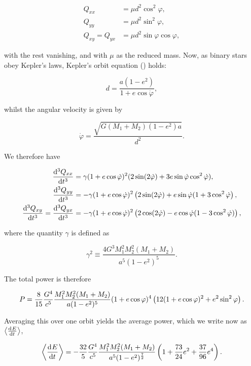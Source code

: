 \begin{align}
    Q_{xx} &= \mu d^2\cos^2\varphi, \\
    Q_{yy} &= \mu d^2\sin^2\varphi, \\
    Q_{xy} = Q_{yx} &= \mu d^2\sin\varphi\cos\varphi,
\end{align}

with the rest vanishing, and with $\mu$ as the reduced mass. Now, as binary stars obey Kepler's laws, Kepler's orbit equation () holds:

\begin{equation}
    d = \frac{a(1-e^2)}{1+e\cos\dot{\varphi}},
\end{equation}

whilst the angular velocity is given by

\begin{equation}
    \dot{\varphi} = \frac{\sqrt{G(M_1+M_2)(1-e^2)a}}{d^2}.
\end{equation}

We therefore have

\begin{align}
    \dv[3]{Q_{xx}}{t} &= \gamma (1+e\cos\dot{\varphi})^2(2\sin(2\dot{\varphi})+3e\sin\dot{\varphi}\cos^2\dot{\varphi}), \\
    \dv[3]{Q_{yy}}{t} &= -\gamma(1+e\cos\dot{\varphi})^2\pqty{2\sin(2\dot{\varphi})+e\sin\dot{\varphi}(1+3\cos^2\dot{\varphi}}, \\
    \dv[3]{Q_{xy}}{t} = \dv[3]{Q_{yx}}{t} &= -\gamma(1+e\cos\dot{\varphi})^2\pqty{2\cos(2\dot{\varphi})-e\cos\dot{\varphi}(1-3\cos^2\dot{\varphi})},
\end{align}

where the quantity $\gamma$ is defined as

\begin{equation}
    \gamma^2 \equiv \frac{4G^3M_1^2M_2^2(M_1+M_2)}{a^5(1-e^2)^5}.
\end{equation}

The total power is therefore

\begin{equation}
    P = \frac{8}{15}\frac{G^4}{c^5}\frac{M_1^2M_2^2(M_1+M_2)}{a(1-e^2)^5}(1+e\cos\varphi)^4\left(12(1+e\cos\varphi)^2+e^2\sin^2\varphi\right).
\end{equation}

Averaging this over one orbit yields the average power, which we write now as $\ev{\dv{E}{t}}$,

\begin{equation}
    \ev{\dv{E}{t}} = -\frac{32}{5}\frac{G^4}{c^5}\frac{M_1^2M_2^2(M_1+M_2)}{a^5(1-e^2)^\frac72}\pqty{1+\frac{73}{24}e^2+\frac{37}{96}e^4}.
    \label{eq:average_power}
\end{equation}

